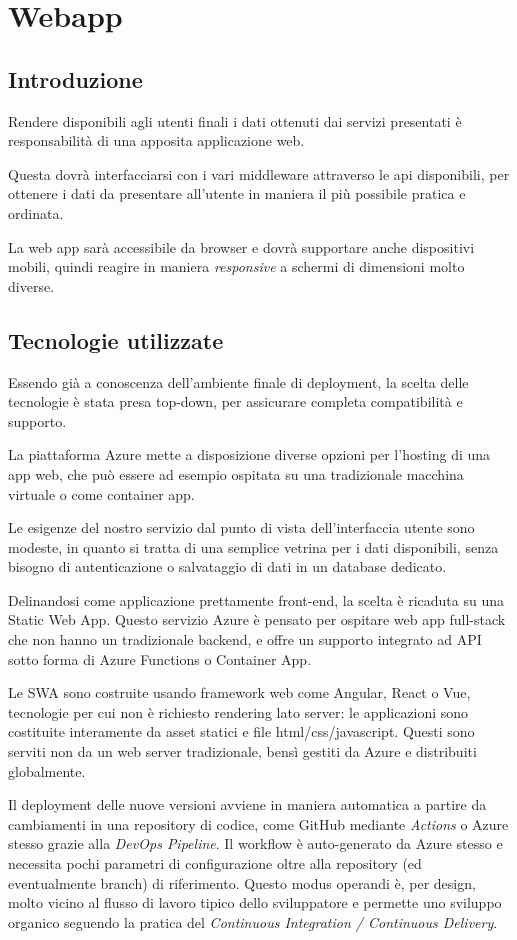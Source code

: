\section{Webapp}
\subsection{Introduzione}
Rendere disponibili agli utenti finali i dati ottenuti dai servizi presentati è responsabilità di una apposita applicazione web. 

Questa dovrà interfacciarsi con i vari middleware attraverso le api disponibili, per ottenere i dati da presentare all'utente in maniera il più possibile pratica e ordinata.

La web app sarà accessibile da browser e dovrà supportare anche dispositivi mobili, quindi reagire in maniera \textit{responsive} a schermi di dimensioni molto diverse. 


\subsection{Tecnologie utilizzate}
Essendo già a conoscenza dell'ambiente finale di deployment, la scelta delle tecnologie è stata presa top-down, per assicurare completa compatibilità e supporto.

La piattaforma Azure mette a disposizione diverse opzioni per l'hosting di una app web, che può essere ad esempio ospitata su una tradizionale macchina virtuale o come container app.

Le esigenze del nostro servizio dal punto di vista dell'interfaccia utente sono modeste, in quanto si tratta di una semplice vetrina per i dati disponibili, senza bisogno di autenticazione o salvataggio di dati in un database dedicato.

Delinandosi come applicazione prettamente front-end, la scelta è ricaduta su una Static Web App. Questo servizio Azure è pensato per ospitare web app full-stack che non hanno un tradizionale backend, e offre un supporto integrato ad API sotto forma di Azure Functions o Container App.

Le SWA sono costruite usando framework web come Angular, React o Vue, tecnologie per cui non è richiesto rendering lato server: le applicazioni sono costituite interamente da asset statici e file html/css/javascript. Questi sono serviti non da un web server tradizionale, bensì gestiti da Azure e distribuiti globalmente.

Il deployment delle nuove versioni avviene in maniera automatica a partire da cambiamenti in una repository di codice, come GitHub mediante \textit{Actions} o Azure stesso grazie alla \textit{DevOps Pipeline}. 
Il workflow è auto-generato da Azure stesso e necessita pochi parametri di configurazione oltre alla repository (ed eventualmente branch) di riferimento. Questo modus operandi è, per design, molto vicino al flusso di lavoro tipico dello sviluppatore e permette uno sviluppo organico seguendo la pratica del \textit{Continuous Integration / Continuous Delivery}.

